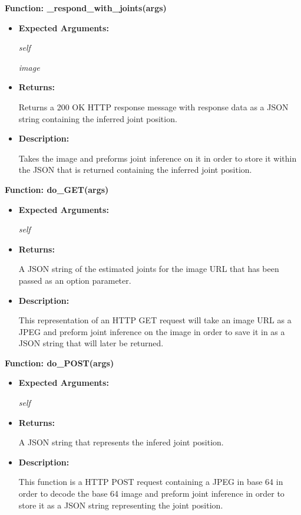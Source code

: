 \documentclass{scrreprt}
\begin{document}
\textbf{Function: \_respond\_with\_joints(args)}
\begin{itemize}
    \item \textbf{Expected Arguments:}

            \quad\textit{self}

            \quad\textit{image}

    \item \textbf{Returns:}

            Returns a 200 OK HTTP response message with response data as a JSON string containing the inferred joint position.

    \item \textbf{Description:}

            Takes the image and preforms joint inference on it in order to store it within the JSON that is returned containing the inferred joint position.

\end{itemize}

\textbf{Function: do\_GET(args)}
\begin{itemize}
    \item \textbf{Expected Arguments:}

           \quad\textit{self}

    \item \textbf{Returns:}

            A JSON string of the estimated joints for the image URL that has been passed as an option parameter.

    \item \textbf{Description:}

            This representation of an HTTP GET request will take an image URL as a JPEG and preform joint inference on the image in order to save it in as a JSON string that will later be returned.

\end{itemize}

\textbf{Function: do\_POST(args)}
\begin{itemize}
    \item \textbf{Expected Arguments:}

            \quad\textit{self}

    \item \textbf{Returns:}

            A JSON string that represents the infered joint position.

    \item \textbf{Description:}

            This function is a HTTP POST request containing a JPEG in base 64 in order to decode the base 64 image and preform joint inference in order to store it as a JSON string representing the joint position.

\end{itemize}
\end{document}
